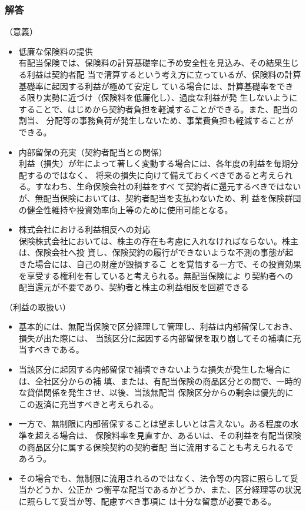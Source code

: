 \documentclass[report,gutter=10mm,fore-edge=10mm,uplatex,dvipdfmx]{jlreq}
\begin{document}
\subsubsection{解答}
（意義）
\begin{itemize}
\item 低廉な保険料の提供\\
 有配当保険では、保険料の計算基礎率に予め安全性を見込み、その結果生じる利益は契約者配
 当で清算するという考え方に立っているが、保険料の計算基礎率に起因する利益が極めて安定し
 ている場合には、計算基礎率をできる限り実勢に近づけ（保険料を低廉化し）、過度な利益が発
 生しないようにすることで、はじめから契約者負担を軽減することができる。また、配当の割当、
 分配等の事務負荷が発生しないため、事業費負担も軽減することができる。
\item 内部留保の充実（契約者配当との関係）\\
 利益（損失）が年によって著しく変動する場合には、各年度の利益を毎期分配するのではなく、
 将来の損失に向けて備えておくべきであると考えられる。すなわち、生命保険会社の利益をすべ
 て契約者に還元するべきではないが、無配当保険においては、契約者配当を支払わないため、利
 益を保険群団の健全性維持や投資効率向上等のために使用可能となる。
\item 株式会社における利益相反への対応\\
 保険株式会社においては、株主の存在も考慮に入れなければならない。株主は、保険会社へ投
 資し、保険契約の履行ができないような不測の事態が起きた場合には、自己の財産が毀損するこ
 とを覚悟する一方で、その投資効果を享受する権利を有していると考えられる。無配当保険によ
 り契約者への配当還元が不要であり、契約者と株主の利益相反を回避できる
\end{itemize}

（利益の取扱い）
\begin{itemize}
\item 基本的には、無配当保険で区分経理して管理し、利益は内部留保しておき、損失が出た際には、
 当該区分に起因する内部留保を取り崩してその補填に充当すべきである。
\item 当該区分に起因する内部留保で補填できないような損失が発生した場合には、全社区分からの補
 填、または、有配当保険の商品区分との間で、一時的な貸借関係を発生させ、以後、当該無配当
 保険区分からの剰余は優先的にこの返済に充当すべきと考えられる。
\item 一方で、無制限に内部留保することは望ましいとは言えない。ある程度の水準を超える場合は、
 保険料率を見直すか、あるいは、その利益を有配当保険の商品区分に属する保険契約の契約者配
 当に流用することも考えられるであろう。
\item その場合でも、無制限に流用されるのではなく、法令等の内容に照らして妥当かどうか、公正か
 つ衡平な配当であるかどうか、また、区分経理等の状況に照らして妥当か等、配慮すべき事項に
 は十分な留意が必要である。
\end{itemize}
\end{document}
